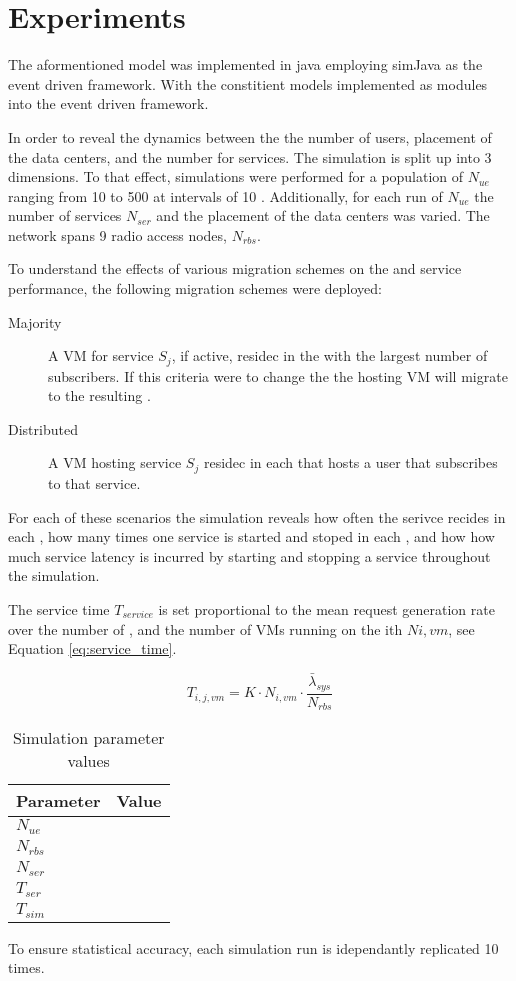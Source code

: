 \section{Experiments}
The aformentioned model was implemented in java employing simJava \cite{SimJava} as the event driven framework. With the constitient models implemented as modules into the event driven framework.

In order to reveal the dynamics between the the number of users, placement of the data centers, and the number for services. The simulation is split up into 3 dimensions. To that effect, simulations were performed for a population of \ues $N_{ue}$ ranging from 10 to 500 \ues at intervals of 10 \ues. Additionally, for each run of $N_{ue}$ the number of services $N_{ser}$ and the placement of the data centers was varied. The network spans 9 radio access nodes, $N_{rbs}$.

To understand the effects of various migration schemes on the \dc and service performance, the following migration schemes were deployed:

\begin{description}
\item[Majority] A VM for service $S_j$, if active, residec in the \dc with the largest number of subscribers. If this criteria were to change the the hosting VM will migrate to the resulting \dc.
\item[Distributed] A VM hosting service $S_j$ residec in each \dc that hosts a user that subscribes to that service.
\end{description}

For each of these scenarios the simulation reveals how often the serivce recides in each \dc, how many times one service is started and stoped in each \dc, and how how much service latency is incurred by starting and stopping a service throughout the simulation.

The \dc service time $T_{service}$ is set proportional to the mean request generation rate over the number of \rbss, and the number of VMs running on the ith \dc $N{i,vm}$, see Equation \ref{eq:service_time}.

\begin{equation}
\label{eq:service_time}
T_{i,j,vm} = K \cdot N_{i,vm} \cdot \frac{ \bar{\lambda}_{sys} }{N_{rbs}}
\end{equation}

\begin{table}[tb]
 	\centering
 	
    \begin{tabular}{|l|l|} \hline
    	\textbf{Parameter}    		& \textbf{Value} \\ \hline
    	$N_{ue}$					& \\ \hline
    	$N_{rbs}$     				& \\ \hline
    	$N_{ser}$ 					& \\ \hline
    	$T_{ser}$  					& \\ \hline
    	$T_{sim}$ 					& \\ \hline
    \end{tabular}
    
    \caption{Simulation parameter values}
    \label{table:simulation_parameters}
\end{table}

To ensure statistical accuracy, each simulation run is idependantly replicated 10 times.